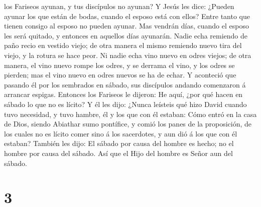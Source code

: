 los Fariseos ayunan, y tus discípulos no ayunan?  Y Jesús
les dice: ¿Pueden ayunar los que están de bodas, cuando el esposo está
con ellos? Entre tanto que tienen consigo al esposo no pueden ayunar.
 Mas vendrán días, cuando el esposo les será quitado, y
entonces en aquellos días ayunarán.  Nadie echa remiendo de
paño recio en vestido viejo; de otra manera el mismo remiendo nuevo tira
del viejo, y la rotura se hace peor.  Ni nadie echa vino
nuevo en odres viejos; de otra manera, el vino nuevo rompe los odres, y
se derrama el vino, y los odres se pierden; mas el vino nuevo en odres
nuevos se ha de echar.  Y aconteció que pasando él por los
sembrados en sábado, sus discípulos andando comenzaron á arrancar
espigas.  Entonces los Fariseos le dijeron: He aquí, ¿por
qué hacen en sábado lo que no es lícito?  Y él les dijo:
¿Nunca leísteis qué hizo David cuando tuvo necesidad, y tuvo hambre, él
y los que con él estaban:  Cómo entró en la casa de Dios,
siendo Abiathar sumo pontífice, y comió los panes de la proposición, de
los cuales no es lícito comer sino á los sacerdotes, y aun dió á los que
con él estaban?  También les dijo: El sábado por causa del
hombre es hecho; no el hombre por causa del sábado.  Así
que el Hijo del hombre es Señor aun del sábado.

\hypertarget{section-2}{%
\section{3}\label{section-2}}

